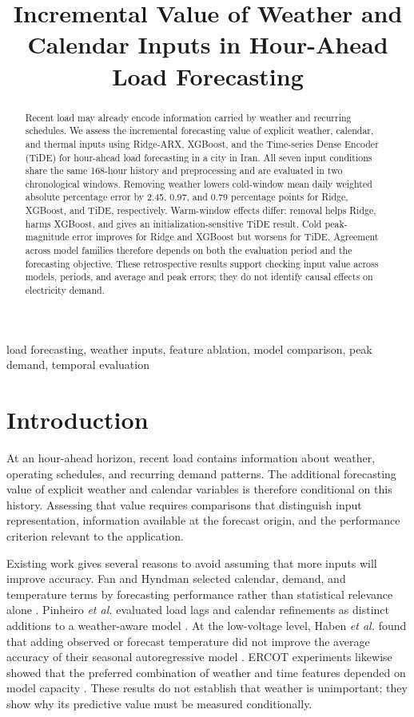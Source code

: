 \documentclass[conference]{IEEEtran}
\begin{document}
\title{Incremental Value of Weather and Calendar Inputs in Hour-Ahead Load Forecasting}

\maketitle

\begin{abstract}
Recent load may already encode information carried by weather and recurring schedules. We assess the incremental forecasting value of explicit weather, calendar, and thermal inputs using Ridge-ARX, XGBoost, and the Time-series Dense Encoder (TiDE) for hour-ahead load forecasting in a city in Iran. All seven input conditions share the same 168-hour history and preprocessing and are evaluated in two chronological windows. Removing weather lowers cold-window mean daily weighted absolute percentage error by 2.45, 0.97, and 0.79 percentage points for Ridge, XGBoost, and TiDE, respectively. Warm-window effects differ: removal helps Ridge, harms XGBoost, and gives an initialization-sensitive TiDE result. Cold peak-magnitude error improves for Ridge and XGBoost but worsens for TiDE. Agreement across model families therefore depends on both the evaluation period and the forecasting objective. These retrospective results support checking input value across models, periods, and average and peak errors; they do not identify causal effects on electricity demand.
\end{abstract}

\begin{IEEEkeywords}
load forecasting, weather inputs, feature ablation, model comparison, peak demand, temporal evaluation
\end{IEEEkeywords}

\section{Introduction}
At an hour-ahead horizon, recent load contains information about weather, operating schedules, and recurring demand patterns. The additional forecasting value of explicit weather and calendar variables is therefore conditional on this history. Assessing that value requires comparisons that distinguish input representation, information available at the forecast origin, and the performance criterion relevant to the application.

Existing work gives several reasons to avoid assuming that more inputs will improve accuracy. Fan and Hyndman selected calendar, demand, and temperature terms by forecasting performance rather than statistical relevance alone \cite{fan2012}. Pinheiro \emph{et al.} evaluated load lags and calendar refinements as distinct additions to a weather-aware model \cite{pinheiro2023}. At the low-voltage level, Haben \emph{et al.} found that adding observed or forecast temperature did not improve the average accuracy of their seasonal autoregressive model \cite{haben2019}. ERCOT experiments likewise showed that the preferred combination of weather and time features depended on model capacity \cite{yang2024}. These results do not establish that weather is unimportant; they show why its predictive value must be measured conditionally.
\end{document}
